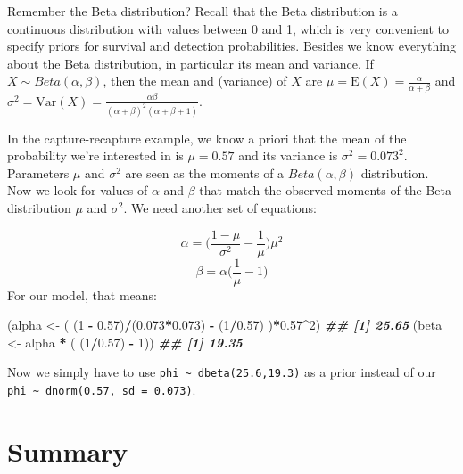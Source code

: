 \documentclass[
  12pt,
]{krantz}
\newenvironment{Shaded}{\begin{snugshade}}{\end{snugshade}}
\newcommand{\DecValTok}[1]{\textcolor[rgb]{0.00,0.00,0.81}{#1}}
\newcommand{\DocumentationTok}[1]{\textcolor[rgb]{0.56,0.35,0.01}{\textbf{\textit{#1}}}}
\newcommand{\FloatTok}[1]{\textcolor[rgb]{0.00,0.00,0.81}{#1}}
\newcommand{\NormalTok}[1]{#1}
\newcommand{\OtherTok}[1]{\textcolor[rgb]{0.56,0.35,0.01}{#1}}
\newcommand{\SpecialCharTok}[1]{\textcolor[rgb]{0.81,0.36,0.00}{\textbf{#1}}}
\begin{document}
Remember the Beta distribution? Recall that the Beta distribution is a continuous distribution with values between 0 and 1, which is very convenient to specify priors for survival and detection probabilities. Besides we know everything about the Beta distribution, in particular its mean and variance. If \(X \sim Beta(\alpha,\beta)\), then the mean and (variance) of \(X\) are \(\mu = \text{E}(X) = \frac{\alpha}{\alpha + \beta}\) and \(\sigma^2 = \text{Var}(X) = \frac{\alpha\beta}{(\alpha + \beta)^2 (\alpha + \beta + 1)}\).

In the capture-recapture example, we know a priori that the mean of the probability we're interested in is \(\mu = 0.57\) and its variance is \(\sigma^2 = 0.073^2\). Parameters \(\mu\) and \(\sigma^2\) are seen as the moments of a \(Beta(\alpha,\beta)\) distribution. Now we look for values of \(\alpha\) and \(\beta\) that match the observed moments of the Beta distribution \(\mu\) and \(\sigma^2\). We need another set of equations:

\[\alpha = \bigg(\frac{1-\mu}{\sigma^2}- \frac{1}{\mu} \bigg)\mu^2\]
\[\beta = \alpha \bigg(\frac{1}{\mu}-1\bigg)\]
For our model, that means:

\begin{Shaded}
\begin{Highlighting}[]
\NormalTok{(alpha }\OtherTok{\textless{}{-}}\NormalTok{ ( (}\DecValTok{1} \SpecialCharTok{{-}} \FloatTok{0.57}\NormalTok{)}\SpecialCharTok{/}\NormalTok{(}\FloatTok{0.073}\SpecialCharTok{*}\FloatTok{0.073}\NormalTok{) }\SpecialCharTok{{-}}\NormalTok{ (}\DecValTok{1}\SpecialCharTok{/}\FloatTok{0.57}\NormalTok{) )}\SpecialCharTok{*}\FloatTok{0.57}\SpecialCharTok{\^{}}\DecValTok{2}\NormalTok{)}
\DocumentationTok{\#\# [1] 25.65}
\NormalTok{(beta }\OtherTok{\textless{}{-}}\NormalTok{ alpha }\SpecialCharTok{*}\NormalTok{ ( (}\DecValTok{1}\SpecialCharTok{/}\FloatTok{0.57}\NormalTok{) }\SpecialCharTok{{-}} \DecValTok{1}\NormalTok{))}
\DocumentationTok{\#\# [1] 19.35}
\end{Highlighting}
\end{Shaded}

Now we simply have to use \texttt{phi\ \textasciitilde{}\ dbeta(25.6,19.3)} as a prior instead of our \texttt{phi\ \textasciitilde{}\ dnorm(0.57,\ sd\ =\ 0.073)}.

\section{Summary}\label{summary-3}
\end{document}
